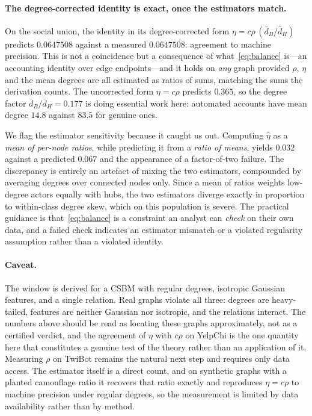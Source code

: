 \documentclass[onecolumn,pdflatex,sn-basic,Numbered]{sn-jnl}
\theoremstyle{thmstyleone}
\theoremstyle{thmstylethree}
\begin{document}
\paragraph{The degree-corrected identity is exact, once the estimators match.}
\label{sec:balance-check}
On the social union, the identity in its degree-corrected form
$\eta = c\rho\,(\bar d_B/\bar d_H)$ predicts $0.0647508$ against a measured
$0.0647508$: agreement to machine precision. This is not a coincidence but a
consequence of what~\eqref{eq:balance} is---an accounting identity over edge
endpoints---and it holds on \emph{any} graph provided $\rho$, $\eta$ and the mean
degrees are all estimated as ratios of sums, matching the sums the derivation counts.
The uncorrected form $\eta = c\rho$ predicts $0.365$, so the degree factor
$\bar d_B/\bar d_H = 0.177$ is doing essential work here: automated accounts have mean
degree $14.8$ against $83.5$ for genuine ones.

We flag the estimator sensitivity because it caught us out. Computing $\hat\eta$ as a
\emph{mean of per-node ratios}, while predicting it from a \emph{ratio of means},
yields $0.032$ against a predicted $0.067$ and the appearance of a factor-of-two
failure. The discrepancy is entirely an artefact of mixing the two estimators, com\-pounded
by averaging degrees over connected nodes only. Since a mean of ratios weights
low-degree actors equally with hubs, the two estimators diverge exactly in proportion
to within-class degree skew, which on this population is severe. The practical
guidance is that~\eqref{eq:balance} is a constraint an analyst can \emph{check} on
their own data, and a failed check indicates an estimator mismatch or a violated
regularity assumption rather than a violated identity.

\paragraph{Caveat.}
The window is derived for a CSBM with regular degrees, isotropic Gaussian features,
and a single relation. Real graphs violate all three: degrees are heavy-tailed,
features are neither Gaussian nor isotropic, and the relations interact. The
numbers above should be read as locating these graphs approximately, not as a
certified verdict, and the agreement of $\eta$ with $c\rho$ on YelpChi is the one
quantity here that constitutes a genuine test of the theory rather than an
application of it. Measuring $\rho$ on TwiBot remains the natural next step and
requires only data access. The estimator itself is a direct count, and on synthetic
graphs with a planted camouflage ratio it recovers that ratio exactly and reproduces
$\eta = c\rho$ to machine precision under regular degrees, so the measurement is
limited by data availability rather than by method.
\end{document}
